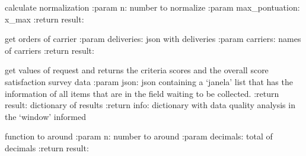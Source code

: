 \documentclass[letterpaper,10pt,english]{sphinxmanual}
\begin{document}
\begin{fulllineitems}
\label{\detokenize{algorithms:algorithms.sgt.sgt_predictor.normalize}}
\sphinxAtStartPar
calculate normalization
:param n: number to normalize
:param max\_pontuation: x\_max
:return result:

\end{fulllineitems}


\begin{fulllineitems}
\label{\detokenize{algorithms:algorithms.sgt.sgt_predictor.orders_of_carrier}}
\sphinxAtStartPar
get orders of carrier
:param deliveries: json with deliveries
:param carriers: names of carriers
:return result:

\end{fulllineitems}


\begin{fulllineitems}
\label{\detokenize{algorithms:algorithms.sgt.sgt_predictor.predict}}
\sphinxAtStartPar
get values of request and returns the criteria scores and the overall score satisfaction survey data
:param json: json containing a ‘janela’ list that has the information of all items that are in the field waiting to be collected.
:return result: dictionary of results
:return info: dictionary with data quality analysis in the ‘window’ informed

\end{fulllineitems}


\begin{fulllineitems}
\label{\detokenize{algorithms:algorithms.sgt.sgt_predictor.round_up}}
\sphinxAtStartPar
function to around
:param n: number to around
:param decimals: total of decimals
:return result:

\end{fulllineitems}
\end{document}
